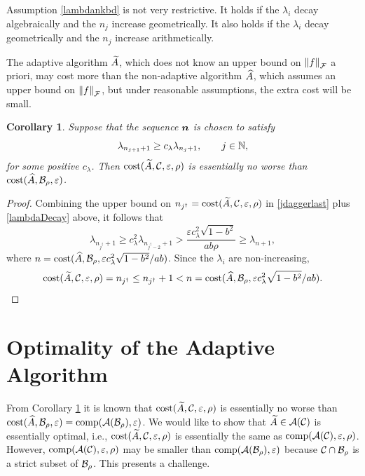 \documentclass[final]{elsarticle}
\newtheorem{cor}[theorem]{Corollary}
\theoremstyle{definition}
\theoremstyle{remark}
\begin{document}
Assumption \eqref{lambdankbd} is not very restrictive.  It holds if the $\lambda_i$ decay algebraically and the $n_j$ increase geometrically.  It also holds if the $\lambda_i$ decay geometrically and the $n_j$ increase arithmetically.

The adaptive algorithm $\tA$, which does not know an upper bound on $\norm[\cf]{f}$ a priori, may cost more than the non-adaptive algorithm $\hA$, which assumes an upper bound on $\norm[\cf]{f}$, but under reasonable assumptions, the extra cost will be small.

\begin{cor} \label{cor:tAsameCosthA} Suppose that the sequence $\vn$ is chosen to satisfy
\begin{equation} \label{lambdaDecay}
\lambda_{n_{j+1}+1} \ge c_\lambda \lambda_{n_j+1}, \qquad j \in \naturals, 
\end{equation}
for some positive $c_\lambda$.  Then $\cost(\tA,\cc, \varepsilon,\rho)$ is essentially no worse than \linebreak[4]
$\cost(\hA,\cb_{\rho},\varepsilon)$. 


\end{cor}

\begin{proof}
Combining the upper bound on $n_{j^\dagger} = \cost(\tA,\cc,\varepsilon,\rho)$ in \eqref{jdaggerlast} plus  \eqref{lambdaDecay} above, it follows that
\begin{equation*}
\lambda_{n_{j^\dagger}+1} \ge c_{\lambda}^2 \lambda_{n_{j^\dagger-2}+1} > \frac{\varepsilon c_{\lambda}^2\sqrt{1 - b^2}}{ab \rho} \ge \lambda_{n+1},
\end{equation*}
where $n = \cost(\hA,\cb_{\rho},\varepsilon c_{\lambda}^2\sqrt{1 - b^2}/ab)$.
Since the $\lambda_i$ are non-increasing,
\begin{equation*}
\cost(\tA,\cc,\varepsilon,\rho) = n_{j^\dagger} \le n_{j^\dagger}+1 < n = \cost(\hA,\cb_{\rho},\varepsilon c_{\lambda}^2\sqrt{1 - b^2}/ab).
\end{equation*}
\end{proof}


\section{Optimality of the Adaptive Algorithm} \label{sec:opt}

From Corollary \ref{cor:tAsameCosthA} it is known that $\cost(\tA,\cc, \varepsilon,\rho)$ is essentially no worse than
$\cost(\hA,\cb_{\rho},\varepsilon) = \comp(\ca(\cb_{\rho}),\varepsilon)$.  We would like to show that $\tA \in \ca(\cc)$ is  essentially optimal, i.e., $\cost(\tA,\cc, \varepsilon,\rho)$ is essentially the same as  $\comp(\ca(\cc),\varepsilon,\rho)$.  However,  $\comp(\ca(\cc),\varepsilon,\rho)$ may be smaller than $\comp(\ca(\cb_{\rho}),\varepsilon)$ because $\cc \cap \cb_\rho$ is a strict subset of  $ \cb_\rho$.  This presents a challenge.
\end{document}
